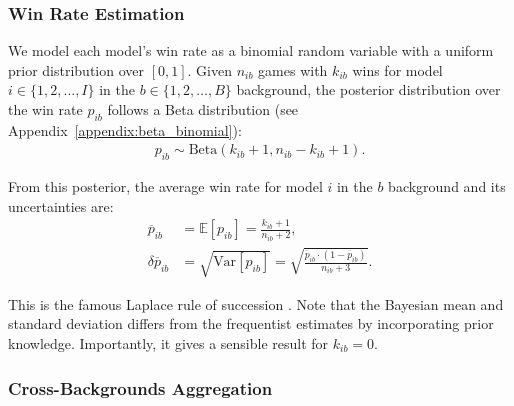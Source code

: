 \documentclass{article}
\begin{document}
\subsubsection{Win Rate Estimation}
\label{sec:win_rate_estimation}

We model each model's win rate as a binomial random variable with a uniform prior distribution over $[0,1]$. Given $n_{ib}$ games with $k_{ib}$ wins for model $i\in\{1,2,\dots,I\}$ in the $b\in\{1,2,\dots,B\}$ background, the posterior distribution over the win rate $p_{ib}$ follows a Beta distribution (see Appendix~\ref{appendix:beta_binomial}):
\begin{align}
p_{ib}\sim \text{Beta}(k_{ib} + 1, n_{ib} - k_{ib} + 1).
\end{align}

From this posterior, the average win rate for model $i$ in the $b$ background and its uncertainties are:
\begin{align}
\overline{p}_{ib} & = \mathbb{E}[p_{ib}] = \frac{k_{ib} + 1}{n_{ib} + 2} \label{eq:binomial_background},\\
\delta\overline{p}_{ib} & =\sqrt{\textrm{Var}[p_{ib}]} = \sqrt{\frac{\overline{p}_{ib} \cdot (1 - \overline{p}_{ib})}{n_{ib} + 3}}.
\label{uncertainty}
\end{align}

This is the famous Laplace rule of succession \cite{Laplace1812}. Note that the Bayesian mean and standard deviation differs from the frequentist estimates by incorporating prior knowledge. Importantly, it gives a sensible result for $k_{ib}=0$.


\subsubsection{Cross-Backgrounds Aggregation}
\label{sec:aggregating_accross_backgrounds}
\end{document}
